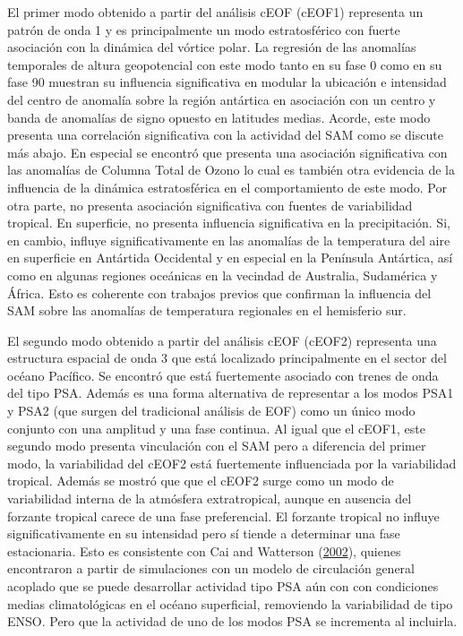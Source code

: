 \documentclass[12pt,oneside,a4paper]{reedthesis}
\begin{document}
El primer modo obtenido a partir del análisis cEOF (cEOF1) representa un patrón de onda 1 y es principalmente un modo estratosférico con fuerte asociación con la dinámica del vórtice polar.
La regresión de las anomalías temporales de altura geopotencial con este modo tanto en su fase 0 como en su fase 90 muestran su influencia significativa en modular la ubicación e intensidad del centro de anomalía sobre la región antártica en asociación con un centro y banda de anomalías de signo opuesto en latitudes medias.
Acorde, este modo presenta una correlación significativa con la actividad del SAM como se discute más abajo.
En especial se encontró que presenta una asociación significativa con las anomalías de Columna Total de Ozono lo cual es también otra evidencia de la influencia de la dinámica estratosférica en el comportamiento de este modo.
Por otra parte, no presenta asociación significativa con fuentes de variabilidad tropical.
En superficie, no presenta influencia significativa en la precipitación.
Si, en cambio, influye significativamente en las anomalías de la temperatura del aire en superficie en Antártida Occidental y en especial en la Península Antártica, así como en algunas regiones oceánicas en la vecindad de Australia, Sudamérica y África.
Esto es coherente con trabajos previos que confirman la influencia del SAM sobre las anomalías de temperatura regionales en el hemisferio sur.

El segundo modo obtenido a partir del análisis cEOF (cEOF2) representa una estructura espacial de onda 3 que está localizado principalmente en el sector del océano Pacífico.
Se encontró que está fuertemente asociado con trenes de onda del tipo PSA.
Además es una forma alternativa de representar a los modos PSA1 y PSA2 (que surgen del tradicional análisis de EOF) como un único modo conjunto con una amplitud y una fase continua.
Al igual que el cEOF1, este segundo modo presenta vinculación con el SAM pero a diferencia del primer modo, la variabilidad del cEOF2 está fuertemente influenciada por la variabilidad tropical.
Además se mostró que que el cEOF2 surge como un modo de variabilidad interna de la atmósfera extratropical, aunque en ausencia del forzante tropical carece de una fase preferencial.
El forzante tropical no influye significativamente en su intensidad pero sí tiende a determinar una fase estacionaria.
Esto es consistente con Cai and Watterson (\protect\hyperlink{ref-cai2002}{2002}), quienes encontraron a partir de simulaciones con un modelo de circulación general acoplado que se puede desarrollar actividad tipo PSA aún con con condiciones medias climatológicas en el océano superficial, removiendo la variabilidad de tipo ENSO.
Pero que la actividad de uno de los modos PSA se incrementa al incluirla.
\end{document}
